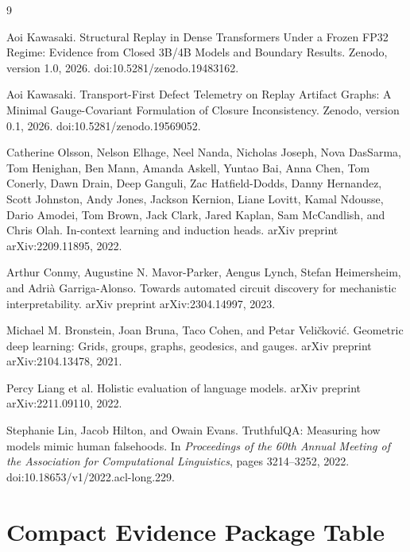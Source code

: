 \documentclass[11pt]{article}
\begin{document}
\begin{thebibliography}{9}

Aoi Kawasaki.
\newblock Structural Replay in Dense Transformers Under a Frozen FP32 Regime:
Evidence from Closed 3B/4B Models and Boundary Results.
\newblock Zenodo, version 1.0, 2026.
\newblock doi:10.5281/zenodo.19483162.

Aoi Kawasaki.
\newblock Transport-First Defect Telemetry on Replay Artifact Graphs:
A Minimal Gauge-Covariant Formulation of Closure Inconsistency.
\newblock Zenodo, version 0.1, 2026.
\newblock doi:10.5281/zenodo.19569052.

Catherine Olsson, Nelson Elhage, Neel Nanda, Nicholas Joseph,
Nova DasSarma, Tom Henighan, Ben Mann, Amanda Askell, Yuntao Bai,
Anna Chen, Tom Conerly, Dawn Drain, Deep Ganguli, Zac Hatfield-Dodds,
Danny Hernandez, Scott Johnston, Andy Jones, Jackson Kernion, Liane Lovitt,
Kamal Ndousse, Dario Amodei, Tom Brown, Jack Clark, Jared Kaplan,
Sam McCandlish, and Chris Olah.
\newblock In-context learning and induction heads.
\newblock arXiv preprint arXiv:2209.11895, 2022.

Arthur Conmy, Augustine N. Mavor-Parker, Aengus Lynch,
Stefan Heimersheim, and Adri\`a Garriga-Alonso.
\newblock Towards automated circuit discovery for mechanistic interpretability.
\newblock arXiv preprint arXiv:2304.14997, 2023.

Michael M. Bronstein, Joan Bruna, Taco Cohen, and Petar Veli\v{c}kovi\'{c}.
\newblock Geometric deep learning: Grids, groups, graphs, geodesics, and gauges.
\newblock arXiv preprint arXiv:2104.13478, 2021.

Percy Liang et al.
\newblock Holistic evaluation of language models.
\newblock arXiv preprint arXiv:2211.09110, 2022.

Stephanie Lin, Jacob Hilton, and Owain Evans.
\newblock TruthfulQA: Measuring how models mimic human falsehoods.
\newblock In \emph{Proceedings of the 60th Annual Meeting of the Association
for Computational Linguistics}, pages 3214--3252, 2022.
\newblock doi:10.18653/v1/2022.acl-long.229.

\end{thebibliography}

\appendix

\section{Compact Evidence Package Table}
\label{app:evidence-package}
\end{document}

